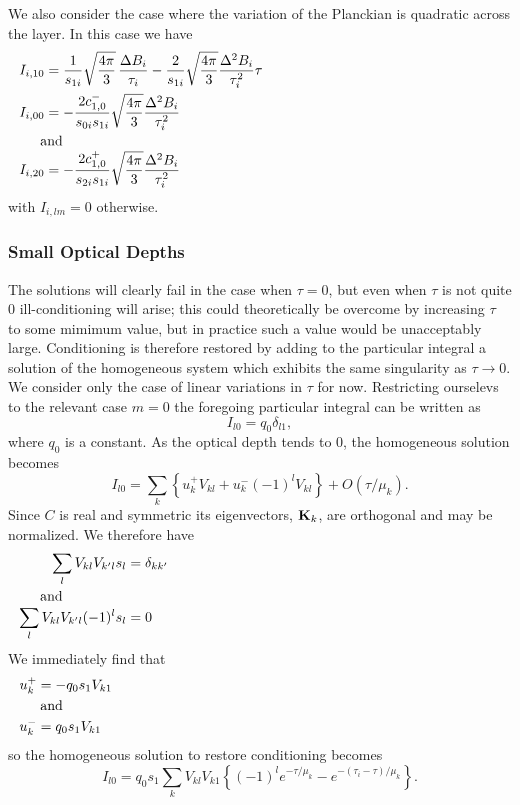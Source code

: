 We also consider the case where the variation of the Planckian is
quadratic across the layer. In this case we have
\begin{align}
I_{i,10} &= {1\over s_{1i}} \sqrt{{4\pi}\over 3} \, 
{{\Delta B_i}\over\tau_i} - {2\over s_{1i}} \sqrt{{4\pi}\over 3} 
{{\Delta^2 B_i}\over\tau_i^2} \tau\\
I_{i,00} &= - {2 c_{1,0}^-\over {s_{0i} s_{1i}}} \sqrt{{4\pi}\over 3}
{{\Delta^2 B_i}\over\tau_i^2}\\
\noalign{and}
I_{i,20} &= - {2 c_{1,0}^+ \over {s_{2i} s_{1i}}} \sqrt{{4\pi}\over 3}
{{\Delta^2 B_i}\over\tau_i^2}
\end{align}
with $I_{i,lm}=0$ otherwise.

\subsubsection{Small Optical Depths}

The solutions will clearly fail in the case when $\tau=0$, but even when
$\tau$ is not quite 0 ill-conditioning will arise; this could theoretically
be overcome by increasing $\tau$ to some mimimum value, but in practice
such a value would be unacceptably large. Conditioning is therefore 
restored by adding to the particular integral a solution of the homogeneous
system which exhibits the same singularity as $\tau\rightarrow 0$. We 
consider only the case of linear variations in $\tau$ for now. Restricting
ourselevs to the relevant case $m=0$ the foregoing particular integral can
be written as
\begin{equation}
I_{l0}=q_{0} \delta_{l1},
\end{equation}
where $q_{0}$ is a constant. As the optical depth tends to 0, the homogeneous
solution becomes
\begin{equation}
I_{l0}=\sum_k \left \{ u_k^+ V_{kl} + u_k^- (-1)^l V_{kl} \right \}
+ O(\tau/\mu_k).
\end{equation}
Since $C$ is real and symmetric its eigenvectors, ${\bf K}_k$, are orthogonal
and may be normalized. We therefore have
\begin{align}
\sum_l V_{kl} V_{k'l} s_l &= \delta_{kk'} \\
\noalign{and} 
\sum_l V_{kl} V_{k'l} (-1)^l s_l &= 0 
\end{align}
We immediately find that
\begin{align}
u_k^+ &= -q_0 s_1 V_{k1} \\
\noalign{and} 
u_k^- &= q_0 s_1 V_{k1} 
\end{align}
so the homogeneous solution to restore conditioning becomes
\begin{equation}
I_{l0}=q_0 s_1 \sum_k V_{kl}V_{k1} \left \{ (-1)^l e^{-\tau/\mu_k} 
-e^{-(\tau_i-\tau)/\mu_k} \right \} .
\end{equation}



